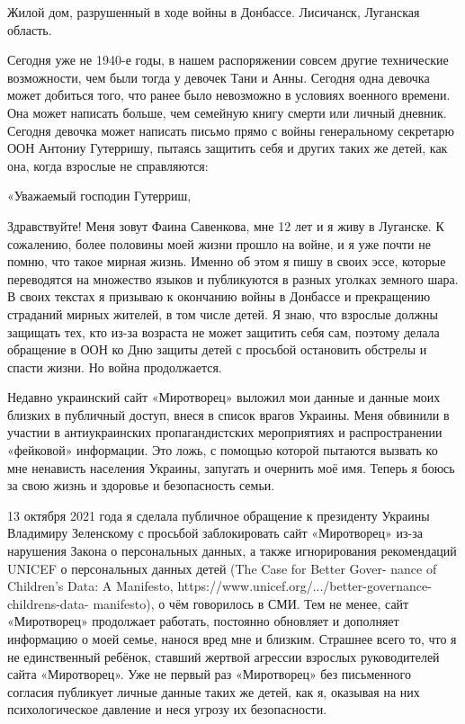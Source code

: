 Жилой дом, разрушенный в ходе войны в Донбассе. Лисичанск, Луганская область.

Сегодня уже не 1940-е годы, в нашем распоряжении совсем другие технические
возможности, чем были тогда у девочек Тани и Анны. Сегодня одна девочка может
добиться того, что ранее было невозможно в условиях военного времени. Она может
написать больше, чем семейную книгу смерти или личный дневник. Сегодня девочка
может написать письмо прямо с войны генеральному секретарю ООН Антониу
Гутерришу, пытаясь защитить себя и других таких же детей, как она, когда
взрослые не справляются:

«Уважаемый господин Гутерриш,

Здравствуйте! Меня зовут Фаина Савенкова, мне 12 лет и я живу в Луганске. К
сожалению, более половины моей жизни прошло на войне, и я уже почти не помню,
что такое мирная жизнь. Именно об этом я пишу в своих эссе, которые переводятся
на множество языков и публикуются в разных уголках земного шара. В своих
текстах я призываю к окончанию войны в Донбассе и прекращению страданий мирных
жителей, в том числе детей. Я знаю, что взрослые должны защищать тех, кто из-за
возраста не может защитить себя сам, поэтому делала обращение в ООН ко Дню
защиты детей с просьбой остановить обстрелы и спасти жизни. Но война
продолжается.

Недавно украинский сайт «Миротворец» выложил мои данные и данные моих близких в
публичный доступ, внеся в список врагов Украины. Меня обвинили в участии в
антиукраинских пропагандистских мероприятиях и распространении «фейковой»
информации. Это ложь, с помощью которой пытаются вызвать ко мне ненависть
населения Украины, запугать и очернить моё имя. Теперь я боюсь за свою жизнь и
здоровье и безопасность семьи.

13 октября 2021 года я сделала публичное обращение к президенту Украины
Владимиру Зеленскому с просьбой заблокировать сайт «Миротворец» из-за нарушения
Закона о персональных данных, а также игнорирования рекомендаций UNICEF о
персональных данных детей (The Case for Better Gover- nance of Children’s Data:
A Manifesto, https://www.unicef.org/.../better-governance-childrens-data-
manifesto), о чём говорилось в СМИ. Тем не менее, сайт «Миротворец» продолжает
работать, постоянно обновляет и дополняет информацию о моей семье, нанося вред
мне и близким. Страшнее всего то, что я не единственный ребёнок, ставший
жертвой агрессии взрослых руководителей сайта «Миротворец». Уже не первый раз
«Миротворец» без письменного согласия публикует личные данные таких же детей,
как я, оказывая на них психологическое давление и неся угрозу их безопасности.

